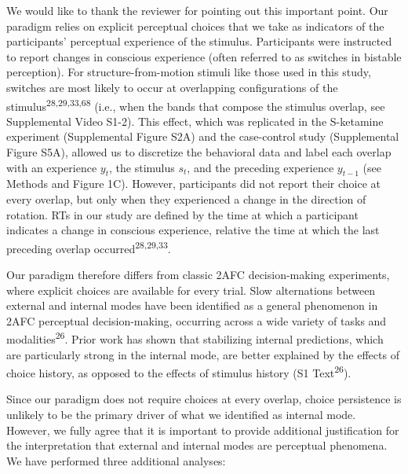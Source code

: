 \documentclass[
]{article}
\begin{document}
We would like to thank the reviewer for pointing out this important
point. Our paradigm relies on explicit perceptual choices that we take
as indicators of the participants' perceptual experience of the
stimulus. Participants were instructed to report changes in conscious
experience (often referred to as switches in bistable perception). For
structure-from-motion stimuli like those used in this study, switches
are most likely to occur at overlapping configurations of the
stimulus\textsuperscript{28,29,33,68} (i.e., when the bands that compose
the stimulus overlap, see Supplemental Video S1-2). This effect, which
was replicated in the S-ketamine experiment (Supplemental Figure S2A)
and the case-control study (Supplemental Figure S5A), allowed us to
discretize the behavioral data and label each overlap with an experience
\(y_t\), the stimulus \(s_t\), and the preceding experience \(y_{t-1}\)
(see Methods and Figure 1C). However, participants did not report their
choice at every overlap, but only when they experienced a change in the
direction of rotation. RTs in our study are defined by the time at which
a participant indicates a change in conscious experience, relative the
time at which the last preceding overlap
occurred\textsuperscript{28,29,33}.

Our paradigm therefore differs from classic 2AFC decision-making
experiments, where explicit choices are available for every trial. Slow
alternations between external and internal modes have been identified as
a general phenomenon in 2AFC perceptual decision-making, occurring
across a wide variety of tasks and modalities\textsuperscript{26}. Prior
work has shown that stabilizing internal predictions, which are
particularly strong in the internal mode, are better explained by the
effects of choice history, as opposed to the effects of stimulus history
(S1 Text\textsuperscript{26}).

Since our paradigm does not require choices at every overlap, choice
persistence is unlikely to be the primary driver of what we identified
as internal mode. However, we fully agree that it is important to
provide additional justification for the interpretation that external
and internal modes are perceptual phenomena. We have performed three
additional analyses:
\end{document}

